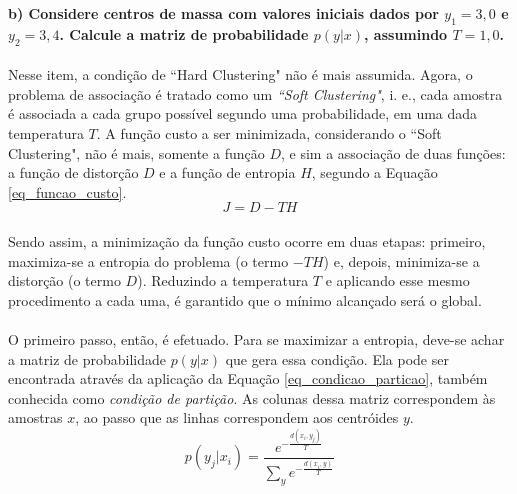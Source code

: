 \documentclass{report}
\begin{document}
\textbf{b) Considere centros de massa com valores iniciais dados por $y_1 = 3,0$ e $y_2 = 3,4$. Calcule a matriz de probabilidade $p(y|x)$, assumindo $T = 1,0$.}\\

\paragraph{} Nesse item, a condição de ``Hard Clustering" {} não é mais assumida. Agora, o problema de associação é tratado como um \emph{``Soft Clustering"}, i. e., cada amostra é associada a cada grupo possível segundo uma probabilidade, em uma dada temperatura $T$. A função custo a ser minimizada, considerando o ``Soft Clustering", não é mais, somente a função $D$, e sim a associação de duas funções: a função de distorção $D$ e a função de entropia $H$, segundo a Equação \eqref{eq_funcao_custo}.\\

\begin{equation}\label{eq_funcao_custo}
J = D - TH
\end{equation}

\paragraph{} Sendo assim, a minimização da função custo ocorre em duas etapas: primeiro, maximiza-se a entropia do problema (o termo $-TH$) e, depois, minimiza-se a distorção (o termo $D$). Reduzindo a temperatura $T$ e aplicando esse mesmo procedimento a cada uma, é garantido que o mínimo alcançado será o global.\\

\paragraph{} O primeiro passo, então, é efetuado. Para se maximizar a entropia, deve-se achar a matriz de probabilidade $p(y|x)$ que gera essa condição. Ela pode ser encontrada através da aplicação da Equação \eqref{eq_condicao_particao}, também conhecida como \emph{condição de partição}. As colunas dessa matriz correspondem às amostras $x$, ao passo que as linhas correspondem aos centróides $y$.\\

\begin{equation}\label{eq_condicao_particao}
p(y_j|x_i) = \frac{e^{-\frac{d(x_i,y_j)}{T}}}{\sum_y e^{-\frac{d(x_i,y)}{T}}}
\end{equation}
\end{document}
